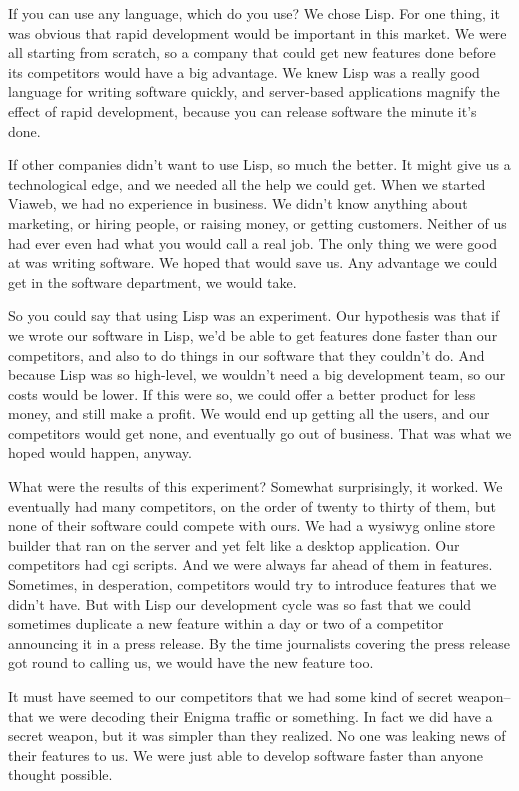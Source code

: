 \documentclass[10pt,twoside,openright]{memoir}
\begin{document}
If you can use any language, which do you use? We chose Lisp. For one thing, it was obvious that rapid development would be important in this market. We were all starting from scratch, so a company that could get new features done before its competitors would have a big advantage. We knew Lisp was a really good language for writing software quickly, and server-based applications magnify the effect of rapid development, because you can release software the minute it's done.

If other companies didn't want to use Lisp, so much the better. It might give us a technological edge, and we needed all the help we could get. When we started Viaweb, we had no experience in business. We didn't know anything about marketing, or hiring people, or raising money, or getting customers. Neither of us had ever even had what you would call a real job. The only thing we were good at was writing software. We hoped that would save us. Any advantage we could get in the software department, we would take.

So you could say that using Lisp was an experiment. Our hypothesis was that if we wrote our software in Lisp, we'd be able to get features done faster than our competitors, and also to do things in our software that they couldn't do. And because Lisp was so high-level, we wouldn't need a big development team, so our costs would be lower. If this were so, we could offer a better product for less money, and still make a profit. We would end up getting all the users, and our competitors would get none, and eventually go out of business. That was what we hoped would happen, anyway.

What were the results of this experiment? Somewhat surprisingly, it worked. We eventually had many competitors, on the order of twenty to thirty of them, but none of their software could compete with ours. We had a wysiwyg online store builder that ran on the server and yet felt like a desktop application. Our competitors had cgi scripts. And we were always far ahead of them in features. Sometimes, in desperation, competitors would try to introduce features that we didn't have. But with Lisp our development cycle was so fast that we could sometimes duplicate a new feature within a day or two of a competitor announcing it in a press release. By the time journalists covering the press release got round to calling us, we would have the new feature too.

It must have seemed to our competitors that we had some kind of secret weapon-- that we were decoding their Enigma traffic or something. In fact we did have a secret weapon, but it was simpler than they realized. No one was leaking news of their features to us. We were just able to develop software faster than anyone thought possible.
\end{document}
